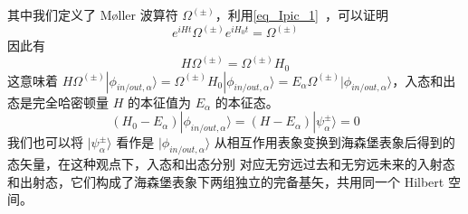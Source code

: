 其中我们定义了 Møller 波算符 $\Omega^{(\pm)}$，利用\autoref{eq_Ipic_1}~，可以证明
\begin{equation}
e^{iHt}\Omega^{(\pm)} e^{iH_0 t}=\Omega^{(\pm)}
\end{equation}
因此有
\begin{equation}
H\Omega^{(\pm)}=\Omega^{(\pm)}H_0
\end{equation}
这意味着 $H\Omega^{(\pm)}|\phi_{in/out,\alpha}\rangle=\Omega^{(\pm)}H_0|\phi_{in/out,\alpha}\rangle =E_\alpha \Omega^{(\pm)}|\phi_{in/out,\alpha}\rangle$，入态和出态是完全哈密顿量 $H$ 的本征值为 $E_\alpha$ 的本征态。
\begin{equation}
(H_0-E_\alpha)|\phi_{in/out,\alpha}\rangle=(H-E_\alpha)|\psi_\alpha^{\pm}\rangle=0
\end{equation}
我们也可以将 $|\psi_\alpha^{\pm}\rangle$ 看作是 $|\phi_{in/out,\alpha}\rangle$ 从相互作用表象变换到海森堡表象后得到的态矢量，在这种观点下，入态和出态分别 对应无穷远过去和无穷远未来的入射态和出射态，它们构成了海森堡表象下两组独立的完备基矢，共用同一个 Hilbert 空间。
